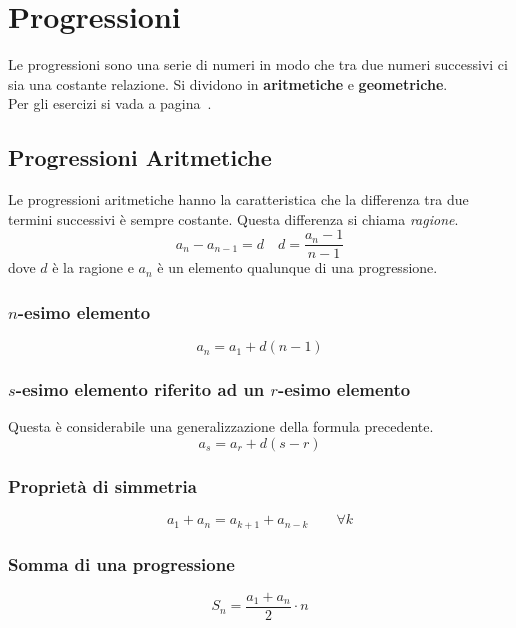 
\section{Progressioni}\label{sec:progressioni}
Le progressioni sono una serie di numeri in modo che tra due numeri successivi ci sia una costante
relazione. Si dividono in \textbf{aritmetiche} e \textbf{geometriche}.\\
Per gli esercizi si vada a pagina~\pageref{ex:progressioni}.

\subsection{Progressioni Aritmetiche}
Le progressioni aritmetiche hanno la caratteristica che la differenza tra due termini successivi è
sempre costante. Questa differenza si chiama \emph{ragione}.
\begin{equation*}
  a_n - a_{n-1} = d \quad d = \frac{a_n-1}{n-1}
\end{equation*}
dove $d$ è la ragione e $a_n$ è un elemento qualunque di una progressione.

\subsubsection{$n$-esimo elemento}
\begin{equation*}
  a_n = a_1 + d(n-1)
\end{equation*}

\subsubsection{$s$-esimo elemento riferito ad un $r$-esimo elemento}
Questa è considerabile una generalizzazione della formula precedente.
\begin{equation*}
  a_s = a_r + d(s-r)
\end{equation*}

\subsubsection{Proprietà di simmetria}
\begin{equation*}
  a_1+a_n = a_{k+1}+a_{n-k}\qquad\forall k
\end{equation*}

\subsubsection{Somma di una progressione}
\begin{equation*}
  S_n = \frac{a_1+a_n}{2}\cdot n
\end{equation*}

